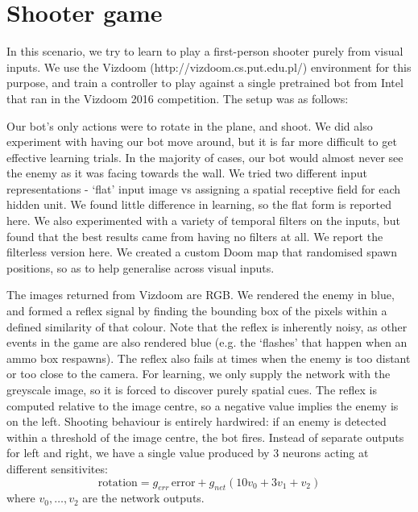 \documentclass{llncs}
\begin{document}
\section{Shooter game}

In this scenario, we try to learn to play a first-person shooter purely from visual inputs. We use the Vizdoom (http://vizdoom.cs.put.edu.pl/) environment for this purpose, and train a controller to play against a single pretrained bot from Intel that ran in the Vizdoom 2016 competition. The setup was as follows:

Our bot’s only actions were to rotate in the plane, and shoot. We did also experiment with having our bot move around, but it is far more difficult to get effective learning trials. In the majority of cases, our bot would almost never see the enemy as it was facing towards the wall. We tried two different input representations - ‘flat’ input image vs assigning a spatial receptive field for each hidden unit. We found little difference in learning, so the flat form is reported here. We also experimented with a variety of temporal filters on the inputs, but found that the best results came from having no filters at all. We report the filterless version here. We created a custom Doom map that randomised spawn positions, so as to help generalise across visual inputs.

The images returned from Vizdoom are RGB. We rendered the enemy in blue, and formed a reflex signal by finding the bounding box of the pixels within a defined similarity of that colour. Note that the reflex is inherently noisy, as other events in the game are also rendered blue (e.g. the ‘flashes’ that happen when an ammo box respawns). The reflex also fails at times when the enemy is too distant or too close to the camera. For learning, we only supply the network with the greyscale image, so it is forced to discover purely spatial cues. The reflex is computed relative to the image centre, so a negative value implies the enemy is on the left. Shooting behaviour is entirely hardwired: if an enemy is detected within a threshold of the image centre, the bot fires. Instead of separate outputs for left and right, we have a single value produced by 3 neurons acting at different sensitivites:
\begin{equation}
\mathrm{rotation} = g_{err}\, \mathrm{error} + g_{net} \left( 10 v_0 + 3 v_1 + v_2 \right)
\end{equation}
where $v_0, \ldots, v_2$ are the network outputs.
\end{document}

